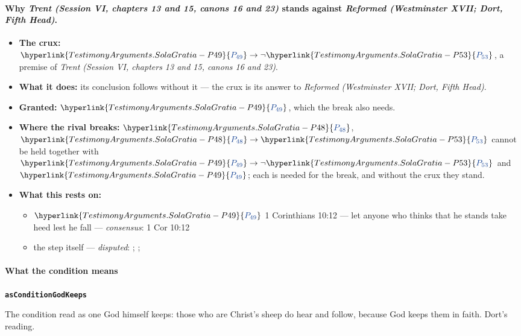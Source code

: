 \documentclass[11pt]{article}
\newcommand{\pvar}[2]{\hyperlink{#1-P#2}{\textcolor{claimlink}{P_{#2}}}}
\begin{document}
\paragraph{Why \emph{Trent (Session VI, chapters 13 and 15, canons 16 and 23)} stands against \emph{Reformed (Westminster XVII; Dort, Fifth Head)}.}
\begin{itemize}
\item \textbf{The crux:} \(\pvar{TestimonyArguments.SolaGratia}{49} \rightarrow \lnot \pvar{TestimonyArguments.SolaGratia}{53}\), a premise of \emph{Trent (Session VI, chapters 13 and 15, canons 16 and 23)}.
\item \textbf{What it does:} its conclusion follows without it --- the crux is its answer to \emph{Reformed (Westminster XVII; Dort, Fifth Head)}.
\item \textbf{Granted:} \(\pvar{TestimonyArguments.SolaGratia}{49}\), which the break also needs.
\item \textbf{Where the rival breaks:} \(\pvar{TestimonyArguments.SolaGratia}{48}\), \(\pvar{TestimonyArguments.SolaGratia}{48} \rightarrow \pvar{TestimonyArguments.SolaGratia}{53}\) cannot be held together with \(\pvar{TestimonyArguments.SolaGratia}{49} \rightarrow \lnot \pvar{TestimonyArguments.SolaGratia}{53}\) and \(\pvar{TestimonyArguments.SolaGratia}{49}\); each is needed for the break, and without the crux they stand.
\item \textbf{What this rests on:}
\begin{itemize}
\item \(\pvar{TestimonyArguments.SolaGratia}{49}\) 1 Corinthians 10:12 — let anyone who thinks that he stands take heed lest he fall --- \emph{consensus}: 1 Cor 10:12
\item the step itself --- \emph{disputed}: \cite[329--330]{calvin-corinthians-1-1848}; \cite[Trent, Session VI (1547), ch. 13]{tanner-decrees-1990}; \cite[40--41]{waterworth-trent-1848}
\end{itemize}
\end{itemize}
\paragraph*{What the condition means}
\leavevmode\par\nobreak
\par\medskip\noindent\textbf{\texttt{as\allowbreak{}Condition\allowbreak{}God\allowbreak{}Keeps}}\par\nobreak\noindent
The condition read as one God himself keeps: those who are Christ’s sheep do hear and follow, because God keeps them in faith. Dort’s reading.
\end{document}
